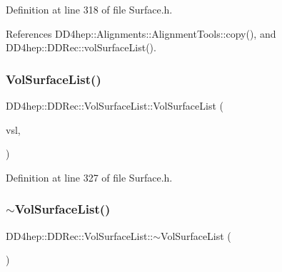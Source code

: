 Definition at line 318 of file Surface.\+h.



References D\+D4hep\+::\+Alignments\+::\+Alignment\+Tools\+::copy(), and D\+D4hep\+::\+D\+D\+Rec\+::vol\+Surface\+List().

\hypertarget{struct_d_d4hep_1_1_d_d_rec_1_1_vol_surface_list_a131b4d74516cb38d5dbc8192c89a03df}{}\label{struct_d_d4hep_1_1_d_d_rec_1_1_vol_surface_list_a131b4d74516cb38d5dbc8192c89a03df} 
\subsubsection{\texorpdfstring{Vol\+Surface\+List()}{VolSurfaceList()}\hspace{0.1cm}{\footnotesize\ttfamily [3/3]}}
{\footnotesize\ttfamily D\+D4hep\+::\+D\+D\+Rec\+::\+Vol\+Surface\+List\+::\+Vol\+Surface\+List (\begin{DoxyParamCaption}\item[{const \hyperlink{struct_d_d4hep_1_1_d_d_rec_1_1_vol_surface_list}{Vol\+Surface\+List} \&}]{vsl,  }\item[{\hyperlink{class_d_d4hep_1_1_geometry_1_1_det_element}{Geometry\+::\+Det\+Element} \&}]{ }\end{DoxyParamCaption})\hspace{0.3cm}{\ttfamily [inline]}}



Definition at line 327 of file Surface.\+h.

\hypertarget{struct_d_d4hep_1_1_d_d_rec_1_1_vol_surface_list_a7729277c83e494f147f21166220debd0}{}\label{struct_d_d4hep_1_1_d_d_rec_1_1_vol_surface_list_a7729277c83e494f147f21166220debd0} 
\subsubsection{\texorpdfstring{$\sim$\+Vol\+Surface\+List()}{~VolSurfaceList()}}
{\footnotesize\ttfamily D\+D4hep\+::\+D\+D\+Rec\+::\+Vol\+Surface\+List\+::$\sim$\+Vol\+Surface\+List (\begin{DoxyParamCaption}{ }\end{DoxyParamCaption})\hspace{0.3cm}{\ttfamily [virtual]}}



